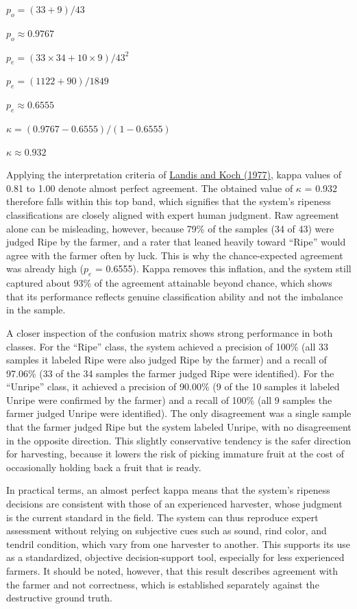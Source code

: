 \begin{thesisprose}
$p_o = (33 + 9) / 43$

$p_o \approx 0.9767$

$p_e = (33 \times 34 + 10 \times 9) / 43^2$

$p_e = (1122 + 90) / 1849$

$p_e \approx 0.6555$

$\kappa = (0.9767 - 0.6555) / (1 - 0.6555)$

$\kappa \approx 0.932$

Applying the interpretation criteria of \hyperlink{cite.landis1977}{Landis and Koch (1977)}, kappa values of 0.81 to 1.00 denote almost perfect agreement. The obtained value of \ensuremath{\kappa} = 0.932 therefore falls within this top band, which signifies that the system's ripeness classifications are closely aligned with expert human judgment. Raw agreement alone can be misleading, however, because 79\% of the samples (34 of 43) were judged Ripe by the farmer, and a rater that leaned heavily toward ``Ripe'' would agree with the farmer often by luck. This is why the chance-expected agreement was already high ($p_e$ = 0.6555). Kappa removes this inflation, and the system still captured about 93\% of the agreement attainable beyond chance, which shows that its performance reflects genuine classification ability and not the imbalance in the sample.

A closer inspection of the confusion matrix shows strong performance in both classes. For the ``Ripe'' class, the system achieved a precision of 100\% (all 33 samples it labeled Ripe were also judged Ripe by the farmer) and a recall of 97.06\% (33 of the 34 samples the farmer judged Ripe were identified). For the ``Unripe'' class, it achieved a precision of 90.00\% (9 of the 10 samples it labeled Unripe were confirmed by the farmer) and a recall of 100\% (all 9 samples the farmer judged Unripe were identified). The only disagreement was a single sample that the farmer judged Ripe but the system labeled Unripe, with no disagreement in the opposite direction. This slightly conservative tendency is the safer direction for harvesting, because it lowers the risk of picking immature fruit at the cost of occasionally holding back a fruit that is ready.

In practical terms, an almost perfect kappa means that the system's ripeness decisions are consistent with those of an experienced harvester, whose judgment is the current standard in the field. The system can thus reproduce expert assessment without relying on subjective cues such as sound, rind color, and tendril condition, which vary from one harvester to another. This supports its use as a standardized, objective decision-support tool, especially for less experienced farmers. It should be noted, however, that this result describes agreement with the farmer and not correctness, which is established separately against the destructive ground truth.


\end{thesisprose}
